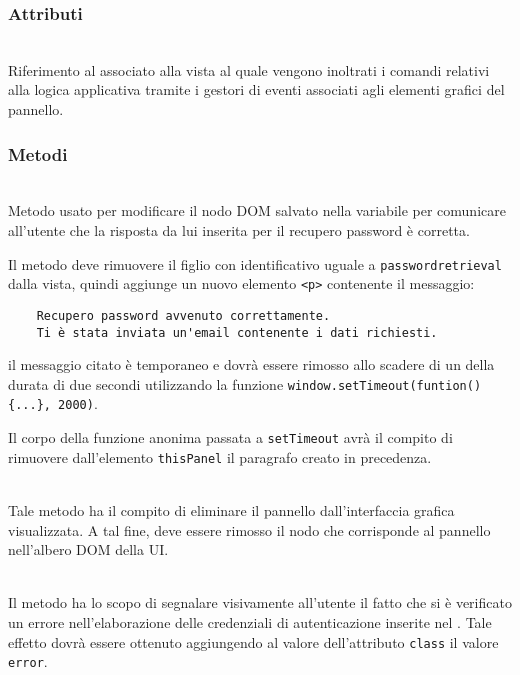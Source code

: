 \subsubsection*{Attributi}
\begin{description}
  \item{}\\
  Riferimento al  associato alla vista al quale vengono inoltrati i comandi relativi alla logica applicativa tramite i gestori di eventi associati agli elementi grafici del pannello.
\end{description}

\subsubsection*{Metodi}
\begin{description}

  \item{}\\
	Metodo usato per modificare il nodo DOM salvato nella variabile  per comunicare all'utente che la risposta da lui inserita per il recupero password è corretta. 
	
Il metodo deve rimuovere il figlio con identificativo uguale a \texttt{passwordretrieval} dalla vista, quindi aggiunge un nuovo elemento \verb'<p>' contenente il messaggio:
\begin{verbatim}
	Recupero password avvenuto correttamente.
	Ti è stata inviata un'email contenente i dati richiesti.
\end{verbatim}
il messaggio citato è temporaneo e dovrà essere rimosso allo scadere di un  della durata di due secondi utilizzando la funzione \verb'window.setTimeout(funtion() {...}, 2000)'.

Il corpo della funzione anonima passata a \verb'setTimeout' avrà il compito di rimuovere dall'elemento \verb'thisPanel' il paragrafo creato in precedenza.

  \item{}\\
  Tale metodo ha il compito di eliminare il pannello dall'interfaccia grafica visualizzata. A tal fine, deve essere rimosso il nodo che corrisponde al pannello nell'albero DOM della UI\@.
  
  \item{}\\
  Il metodo ha lo scopo di segnalare visivamente all'utente il fatto che si è verificato un errore nell'elaborazione delle credenziali di autenticazione inserite nel . Tale effetto dovrà essere ottenuto aggiungendo al valore dell'attributo \verb+class+ il valore \verb+error+.


\end{description}
